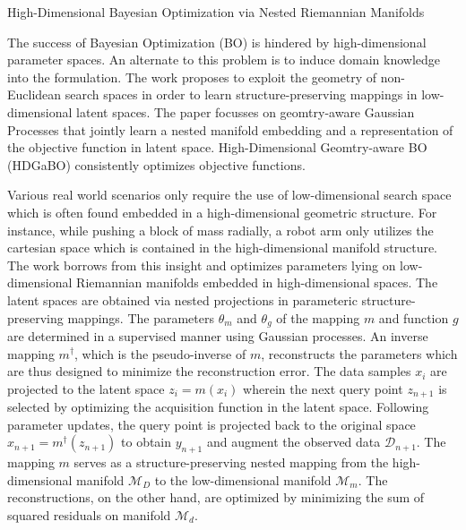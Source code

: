 \documentclass[12pt,letterpaper]{article}
\begin{document}
\begin{center}
  \large{High-Dimensional Bayesian Optimization
  via Nested Riemannian Manifolds}
\end{center}

The success of Bayesian Optimization (BO) is hindered by high-dimensional parameter spaces. An alternate to this problem is to induce domain knowledge into the formulation. The work proposes to exploit the geometry of non-Euclidean search spaces in order to learn structure-preserving mappings in low-dimensional latent spaces. The paper focusses on geomtry-aware Gaussian Processes that jointly learn a nested manifold embedding and a representation of the objective function in latent space. High-Dimensional Geomtry-aware BO (HDGaBO) consistently optimizes objective functions.

Various real world scenarios only require the use of low-dimensional search space which is often found embedded in a high-dimensional geometric structure. For instance, while pushing a block of mass radially, a robot arm only utilizes the cartesian space which is contained in the high-dimensional manifold structure. The work borrows from this insight and optimizes parameters lying on low-dimensional Riemannian manifolds embedded in high-dimensional spaces. The latent spaces are obtained via nested projections in parameteric structure-preserving mappings. The parameters $\theta_{m}$ and $\theta_{g}$ of the mapping $m$ and function $g$ are determined in a supervised manner using Gaussian processes. An inverse mapping $m^{\dag}$, which is the pseudo-inverse of $m$, reconstructs the parameters which are thus designed to minimize the reconstruction error. The data samples $x_{i}$ are projected to the latent space $z_{i} = m(x_{i})$ wherein the next query point $z_{n+1}$ is selected by optimizing the acquisition function in the latent space. Following parameter updates, the query point is projected back to the original space $x_{n+1} = m^{\dag}(z_{n+1})$ to obtain $y_{n+1}$ and augment the observed data $\mathcal{D}_{n+1}$. The mapping $m$ serves as a structure-preserving nested mapping from the high-dimensional manifold $\mathcal{M}_{D}$ to the low-dimensional manifold $\mathcal{M}_{m}$. The reconstructions, on the other hand, are optimized by minimizing the sum of squared residuals on manifold $\mathcal{M}_{d}$.
\end{document}
